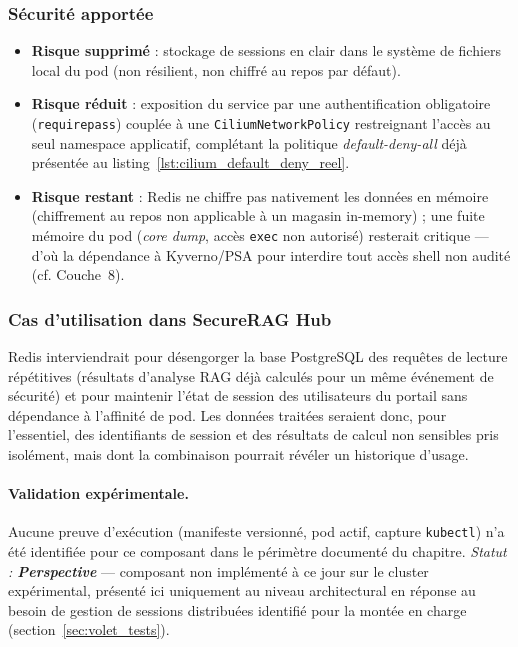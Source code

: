 \subsubsection{Sécurité apportée}
\begin{itemize}
    \item \textbf{Risque supprimé} : stockage de sessions en clair dans le système de fichiers local du pod (non résilient, non chiffré au repos par défaut).
    \item \textbf{Risque réduit} : exposition du service par une authentification obligatoire (\texttt{requirepass}) couplée à une \texttt{CiliumNetworkPolicy} restreignant l'accès au seul namespace applicatif, complétant la politique \textit{default-deny-all} déjà présentée au listing~\ref{lst:cilium_default_deny_reel}.
    \item \textbf{Risque restant} : Redis ne chiffre pas nativement les données en mémoire (chiffrement au repos non applicable à un magasin in-memory) ; une fuite mémoire du pod (\textit{core dump}, accès \texttt{exec} non autorisé) resterait critique — d'où la dépendance à Kyverno/PSA pour interdire tout accès shell non audité (cf. Couche~8).
\end{itemize}

\subsubsection{Cas d'utilisation dans SecureRAG Hub}
Redis interviendrait pour désengorger la base PostgreSQL des requêtes de lecture répétitives (résultats d'analyse RAG déjà calculés pour un même événement de sécurité) et pour maintenir l'état de session des utilisateurs du portail sans dépendance à l'affinité de pod. Les données traitées seraient donc, pour l'essentiel, des identifiants de session et des résultats de calcul non sensibles pris isolément, mais dont la combinaison pourrait révéler un historique d'usage.

\paragraph{Validation expérimentale.}
Aucune preuve d'exécution (manifeste versionné, pod actif, capture \texttt{kubectl}) n'a été identifiée pour ce composant dans le périmètre documenté du chapitre. \textit{Statut : \textbf{Perspective}} — composant non implémenté à ce jour sur le cluster expérimental, présenté ici uniquement au niveau architectural en réponse au besoin de gestion de sessions distribuées identifié pour la montée en charge (section~\ref{sec:volet_tests}).


